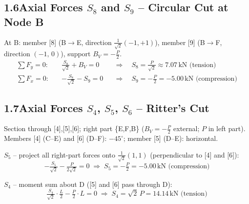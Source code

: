 \documentclass[a4paper,11pt]{article}
\begin{document}
\begin{center}
\end{center}


\subsection*{1.6\quad Axial Forces $S_8$ and $S_9$ -- Circular Cut at Node B}

At B: member [8] (B$\to$E, direction $\tfrac{1}{\sqrt{2}}(-1,+1)$),
member [9] (B$\to$F, direction $(-1,\,0)$), support $B_V = -\tfrac{P}{2}$.
\begin{align*}
  \sum F_y = 0:\quad & \tfrac{S_8}{\sqrt{2}} + B_V = 0
    &&\Rightarrow\quad \boxed{S_8 = \tfrac{P}{\sqrt{2}} \approx 7.07\,\text{kN (tension)}} \\
  \sum F_x = 0:\quad & -\tfrac{S_8}{\sqrt{2}} - S_9 = 0
    &&\Rightarrow\quad \boxed{S_9 = -\tfrac{P}{2} = -5.00\,\text{kN (compression)}}
\end{align*}

\subsection*{1.7\quad Axial Forces $S_4$, $S_5$, $S_6$ -- Ritter's Cut}

Section through [4],[5],[6]; right part \{E,F,B\} ($B_V = -\tfrac{P}{2}$ external; $P$ in left part).
Members [4] (C--E) and [6] (D--F): $-45^\circ$; member [5] (D--E): horizontal.

\textbf{$S_5$} -- project all right-part forces onto $\tfrac{1}{\sqrt{2}}(1,1)$
(perpendicular to [4] and [6]):
\[
  -\tfrac{S_5}{\sqrt{2}} - \tfrac{P}{2\sqrt{2}} = 0
  \;\Rightarrow\; \boxed{S_5 = -\tfrac{P}{2} = -5.00\,\text{kN (compression)}}
\]

\textbf{$S_4$} -- moment sum about D ([5] and [6] pass through D):
\[
  \tfrac{S_4}{\sqrt{2}}\cdot\tfrac{L}{2} - \tfrac{P}{2}\cdot L = 0
  \;\Rightarrow\; \boxed{S_4 = \sqrt{2}\,P = 14.14\,\text{kN (tension)}}
\]
\end{document}
